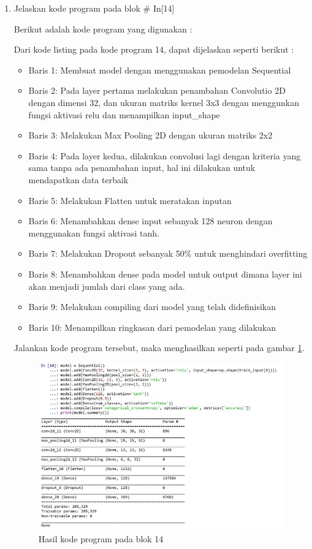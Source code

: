 \begin{enumerate}
\item Jelaskan kode program pada blok \# In[14]
	\par Berikut adalah kode program yang digunakan :
	
	\par Dari kode listing pada kode program 14, dapat dijelaskan seperti berikut :
	\begin{itemize}
	\item Baris 1: Membuat model dengan menggunakan pemodelan Sequential
	\item Baris 2: Pada layer pertama melakukan penambahan Convolutio 2D dengan dimensi 32, dan ukuran matriks kernel 3x3 dengan menggunkan fungsi aktivasi relu dan menampilkan input\_shape
	\item Baris 3: Melakukan Max Pooling 2D dengan ukuran matriks 2x2
	\item Baris 4: Pada layer kedua, dilakukan convolusi lagi dengan kriteria yang sama tanpa ada penambahan input, hal ini dilakukan untuk mendapatkan data terbaik
	\item Baris 5: Melakukan Flatten untuk meratakan inputan
	\item Baris 6: Menambahkan dense input sebanyak 128 neuron dengan menggunakan fungsi aktivasi tanh.
	\item Baris 7: Melakukan Dropout sebanyak 50\% untuk menghindari overfitting
	\item Baris 8: Menambahkan dense pada model untuk output dimana layer ini akan menjadi jumlah dari class yang ada.
	\item Baris 9: Melakukan compiling dari model yang telah didefinisikan 
	\item Baris 10: Menampilkan ringkasan dari pemodelan yang dilakukan 
	\end{itemize}
	\par Jalankan kode program tersebut, maka menghasilkan seperti pada gambar \ref{andri14}.
		\begin{figure}[!hbtp]
		\centering
		\includegraphics[scale=0.5]{figures/chapter7/andri14.jpg}
		\caption{Hasil kode program pada blok 14}
		\label{andri14}
		\end{figure}


\end{enumerate}
